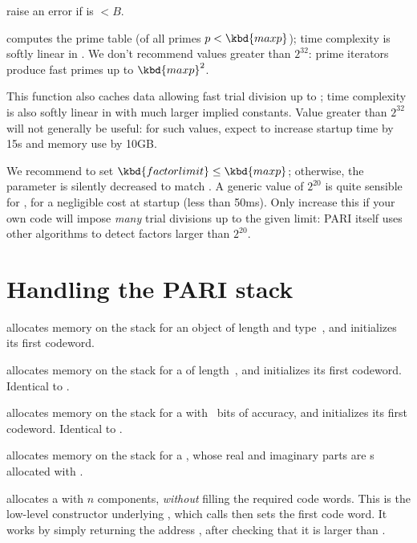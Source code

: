 raise an error if  is $< B$.

 computes
the prime table  (of all primes $p < \kbd{maxp}$);
time complexity is softly linear in . We don't recommend values
greater than $2^{32}$: prime iterators produce fast primes up to
$\kbd{maxp}^2$.

This function also caches data allowing fast trial division up to
; time complexity is also softly linear in 
with much larger implied constants. Value greater than $2^{32}$ will not
generally be useful: for such values, expect to increase startup time by 15s
and memory use by 10GB.

We recommend to set $\kbd{factorlimit} \leq \kbd{maxp}$; otherwise, the
parameter  is silently decreased to match .
A generic value of $2^{20}$ is quite sensible for , for a
negligible cost at startup (less than 50ms). Only increase this if your own
code will impose \emph{many} trial divisions up to the given limit: PARI
itself uses other algorithms to detect factors larger than $2^{20}$.

\section{Handling the PARI stack}


 allocates memory on the stack for
an object of length  and type~, and initializes its first
codeword.

 allocates memory on the stack for a 
of length~, and initializes its first codeword. Identical to
.

 allocates memory on the stack for a 
with~ bits of accuracy, and initializes its first codeword. Identical to
.

 allocates memory on the stack for a
, whose real and imaginary parts are s
allocated with .

 allocates a  with $n$ components,
\emph{without} filling the required code words. This is the low-level
constructor underlying , which calls  then sets
the first code word. It works by simply returning the address
, after checking that it is larger than .

